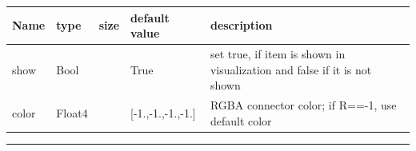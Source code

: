 \begin{center}
  \footnotesize
  \begin{longtable}{| p{4.5cm} | p{2.5cm} | p{0.5cm} | p{2.5cm} | p{6cm} |}
    \hline
    \bf Name & \bf type & \bf size & \bf default value & \bf description \\ \hline
    show &     Bool &      &     True &     set true, if item is shown in visualization and false if it is not shown\\ \hline
    color &     Float4 &      &     [-1.,-1.,-1.,-1.] &     RGBA connector color; if R==-1, use default color\\ \hline
	  \end{longtable}
	\end{center}
\par\noindent\rule{\textwidth}{0.4pt}
\label{description_ObjectConnectorCoordinateVector}
